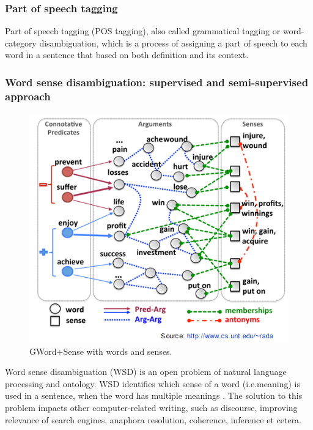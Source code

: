 \subsubsection*{Part of speech tagging}

Part of speech tagging (POS tagging), also called grammatical tagging or word-category disambiguation, which is a process of assigning a part of speech to each word in a sentence that based on both definition and its context.\\
 
\subsubsection*{Word sense disambiguation: supervised and semi-supervised approach}

\begin{figure}[tbh]
	\begin{center}
		\includegraphics[width=\columnwidth]{Union_Background_Chart_WSD}
	\end{center}
	\caption{GWord+Sense with words and senses. \label{fig1}}
\end{figure}

Word sense disambiguation (WSD) is an open problem of natural language processing and ontology. WSD identifies which sense of a word (i.e.meaning) is used in a sentence,
when the word has multiple meanings \cite{Du2013}. The solution to this problem impacts other computer-related writing, such as discourse, 
improving relevance of search engines, anaphora resolution, coherence, inference et cetera.

